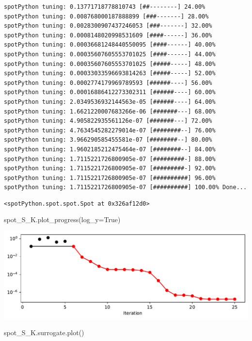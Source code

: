 \documentclass[
  letterpaper,
  DIV=11,
  numbers=noendperiod]{scrreprt}
\newenvironment{Shaded}{\begin{snugshade}}{\end{snugshade}}
\newcommand{\NormalTok}[1]{\textcolor[rgb]{0.00,0.23,0.31}{#1}}
\newcommand{\OperatorTok}[1]{\textcolor[rgb]{0.37,0.37,0.37}{#1}}
\newcommand{\VariableTok}[1]{\textcolor[rgb]{0.07,0.07,0.07}{#1}}
\begin{document}
\begin{verbatim}
spotPython tuning: 0.13771718778810743 [##--------] 24.00% 
spotPython tuning: 0.008768000187888899 [###-------] 28.00% 
spotPython tuning: 0.0028300907437246053 [###-------] 32.00% 
spotPython tuning: 0.0008148020998531609 [####------] 36.00% 
spotPython tuning: 0.00036681248440550095 [####------] 40.00% 
spotPython tuning: 0.00035607605553701025 [####------] 44.00% 
spotPython tuning: 0.00035607605553701025 [#####-----] 48.00% 
spotPython tuning: 0.00033033596693814263 [#####-----] 52.00% 
spotPython tuning: 0.0002774179969789593 [######----] 56.00% 
spotPython tuning: 0.00016886412273302311 [######----] 60.00% 
spotPython tuning: 2.0349536932144563e-05 [######----] 64.00% 
spotPython tuning: 1.6621220007683266e-06 [#######---] 68.00% 
spotPython tuning: 4.905822935561126e-07 [#######---] 72.00% 
spotPython tuning: 4.7634545282279014e-07 [########--] 76.00% 
spotPython tuning: 3.966290585455581e-07 [########--] 80.00% 
spotPython tuning: 1.9602185212475464e-07 [########--] 84.00% 
spotPython tuning: 1.7115221726800905e-07 [#########-] 88.00% 
spotPython tuning: 1.7115221726800905e-07 [#########-] 92.00% 
spotPython tuning: 1.7115221726800905e-07 [##########] 96.00% 
spotPython tuning: 1.7115221726800905e-07 [##########] 100.00% Done...
\end{verbatim}

\begin{verbatim}
<spotPython.spot.spot.Spot at 0x326af12d0>
\end{verbatim}

\begin{Shaded}
\begin{Highlighting}[]
\NormalTok{spot\_S\_K.plot\_progress(log\_y}\OperatorTok{=}\VariableTok{True}\NormalTok{)}
\end{Highlighting}
\end{Shaded}

\includegraphics{012_num_spot_ei_files/figure-pdf/cell-39-output-1.pdf}

\begin{Shaded}
\begin{Highlighting}[]
\NormalTok{spot\_S\_K.surrogate.plot()}
\end{Highlighting}
\end{Shaded}
\end{document}
